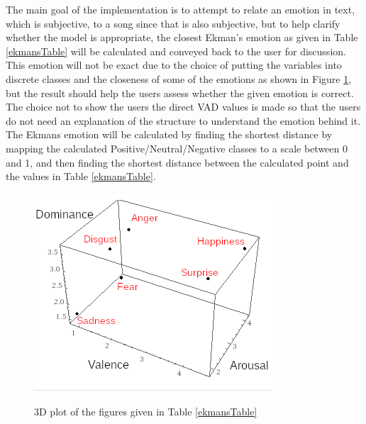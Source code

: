 The main goal of the implementation is to attempt to relate an emotion in text, which is subjective, to a song since that is also subjective, but to help clarify whether the model is appropriate, the closest Ekman's emotion as given in Table \ref{ekmansTable} will be calculated and conveyed back to the user for discussion. This emotion will not be exact due to the choice of putting the variables into discrete classes and the closeness of some of the emotions as shown in Figure \ref{ekmans:graph}, but the result should help the users assess whether the given emotion is correct. The choice not to show the users the direct VAD values is made so that the users do not need an explanation of the structure to understand the emotion behind it. The Ekmans emotion will be calculated by finding the shortest distance by mapping the calculated Positive/Neutral/Negative classes to a scale between 0 and 1, and then finding the shortest distance between the calculated point and the values in Table \ref{ekmansTable}.

\begin{figure}[ht]
\centering
\includegraphics[scale=2]{litImgs/Ekmans3d.png}
\label{ekmans:graph}
\caption{3D plot of the figures given in Table \ref{ekmansTable}}
\end{figure}

